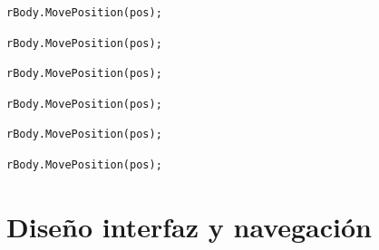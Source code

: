 \begin{lstlisting}[frame=single]
        rBody.MovePosition(pos);
\end{lstlisting}
\begin{lstlisting}[frame=single]
        rBody.MovePosition(pos);
\end{lstlisting}
\begin{lstlisting}[frame=single]
        rBody.MovePosition(pos);
\end{lstlisting}
\begin{lstlisting}[frame=single]
        rBody.MovePosition(pos);
\end{lstlisting}
\begin{lstlisting}[frame=single]
        rBody.MovePosition(pos);
\end{lstlisting}
\begin{lstlisting}[frame=single]
        rBody.MovePosition(pos);
\end{lstlisting}

\section{Diseño interfaz y navegación}
